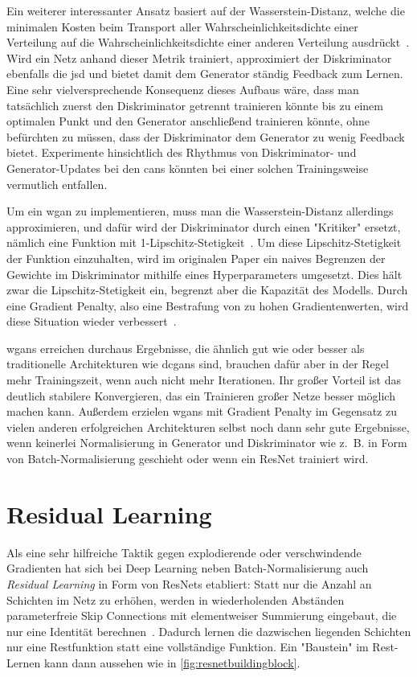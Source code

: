 Ein weiterer interessanter Ansatz basiert auf der Wasserstein-Distanz, welche die minimalen Kosten beim Transport aller Wahrscheinlichkeitsdichte einer Verteilung auf die Wahrscheinlichkeitsdichte einer anderen Verteilung ausdrückt~\cite{Arjovsky.2017}.
Wird ein Netz anhand dieser Metrik trainiert, approximiert der Diskriminator ebenfalls die \gls{jsd} und bietet damit dem Generator ständig Feedback zum Lernen.
Eine sehr vielversprechende Konsequenz dieses Aufbaus wäre, dass man tatsächlich zuerst den Diskriminator getrennt trainieren könnte bis zu einem optimalen Punkt und den Generator anschließend trainieren könnte, ohne befürchten zu müssen, dass der Diskriminator dem Generator zu wenig Feedback bietet.
Experimente hinsichtlich des Rhythmus von Diskriminator- und Generator-Updates bei den \glspl{can} könnten bei einer solchen Trainingsweise vermutlich entfallen.

Um ein \gls{wgan} zu implementieren, muss man die Wasserstein-Distanz allerdings approximieren, und dafür wird der Diskriminator durch einen "Kritiker" ersetzt, nämlich eine Funktion mit 1-Lipschitz-Stetigkeit~\cite{Arjovsky.2017b}.
Um diese Lipschitz-Stetigkeit der Funktion einzuhalten, wird im originalen Paper ein naives Begrenzen der Gewichte im Diskriminator mithilfe eines Hyperparameters umgesetzt.
Dies hält zwar die Lipschitz-Stetigkeit ein, begrenzt aber die Kapazität des Modells.
Durch eine Gradient Penalty, also eine Bestrafung von zu hohen Gradientenwerten, wird diese Situation wieder verbessert~\cite{Gulrajani.2017}.

\glspl{wgan} erreichen durchaus Ergebnisse, die ähnlich gut wie oder besser als traditionelle Architekturen wie \glspl{dcgan} sind, brauchen dafür aber in der Regel mehr Trainingszeit, wenn auch nicht mehr Iterationen.
Ihr großer Vorteil ist das deutlich stabilere Konvergieren, das ein Trainieren großer Netze besser möglich machen kann.
Außerdem erzielen \glspl{wgan} mit Gradient Penalty im Gegensatz zu vielen anderen erfolgreichen Architekturen selbst noch dann sehr gute Ergebnisse, wenn keinerlei Normalisierung in Generator und Diskriminator wie z.~B. in Form von Batch-Normalisierung geschieht oder wenn ein ResNet trainiert wird.



\section{Residual Learning}

Als eine sehr hilfreiche Taktik gegen explodierende oder verschwindende Gradienten hat sich bei Deep Learning neben Batch-Normalisierung auch \emph{Residual Learning} in Form von ResNets etabliert:
Statt nur die Anzahl an Schichten im Netz zu erhöhen, werden in wiederholenden Abständen parameterfreie Skip Connections mit elementweiser Summierung eingebaut, die nur eine Identität berechnen~\cite{He.2016}.
Dadurch lernen die dazwischen liegenden Schichten nur eine Restfunktion statt eine vollständige Funktion.
Ein "Baustein" im Rest-Lernen kann dann aussehen wie in \autoref{fig:resnetbuildingblock}.

